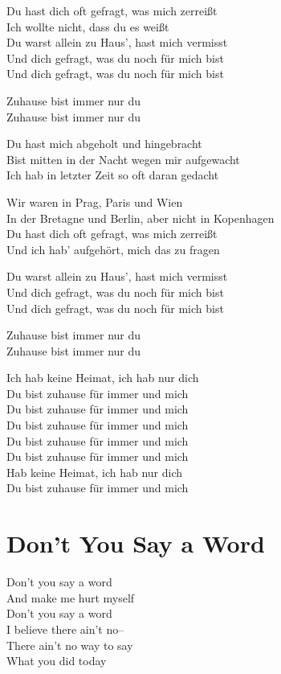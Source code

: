 \documentclass[]{book}
\begin{document}
Du hast dich oft gefragt, was mich zerreißt\\
Ich wollte nicht, dass du es weißt\\
Du warst allein zu Haus', hast mich vermisst\\
Und dich gefragt, was du noch für mich bist\\
Und dich gefragt, was du noch für mich bist

Zuhause bist immer nur du\\
Zuhause bist immer nur du

Du hast mich abgeholt und hingebracht\\
Bist mitten in der Nacht wegen mir aufgewacht\\
Ich hab in letzter Zeit so oft daran gedacht

Wir waren in Prag, Paris und Wien\\
In der Bretagne und Berlin, aber nicht in Kopenhagen\\
Du hast dich oft gefragt, was mich zerreißt\\
Und ich hab' aufgehört, mich das zu fragen

Du warst allein zu Haus', hast mich vermisst\\
Und dich gefragt, was du noch für mich bist\\
Und dich gefragt, was du noch für mich bist

Zuhause bist immer nur du\\
Zuhause bist immer nur du

Ich hab keine Heimat, ich hab nur dich\\
Du bist zuhause für immer und mich\\
Du bist zuhause für immer und mich\\
Du bist zuhause für immer und mich\\
Du bist zuhause für immer und mich\\
Du bist zuhause für immer und mich\\
Hab keine Heimat, ich hab nur dich\\
Du bist zuhause für immer und mich

\hypertarget{dont-you-say-a-word}{%
\section{Don't You Say a Word}\label{dont-you-say-a-word}}

Don't you say a word\\
And make me hurt myself\\
Don't you say a word\\
I believe there ain't no--\\
There ain't no way to say\\
What you did today
\end{document}
